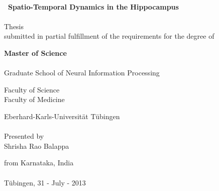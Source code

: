 
\begin{titlepage}
\begin{center}



 \textit{}\\[1cm]



{\huge \bfseries \ Spatio-Temporal Dynamics in the Hippocampus}\\[0.4cm] %

 
\textit{}\\[1.8cm]

\large Thesis\\ submitted in partial fulfillment of the requirements for the degree of

{\bf Master of Science}\\[0.8cm] %

\textit{}\\[1.8cm]
{Graduate School of Neural Information Processing}

{Faculty of Science\\
Faculty of Medicine}

{Eberhard-Karls-Universit\"at T\"ubingen}\\[0.5cm]
 
 
 \textit{}\\[1.8cm]
{Presented by}\\

Shrisha Rao Balappa


from Karnataka, India \\[0.5cm]

 \textit{}\\[1.8cm]
{T\"ubingen, 31 - July - 2013}
 


\vfill
\end{center}

\end{titlepage}


\pagestyle{empty} %

\null\vfill %



